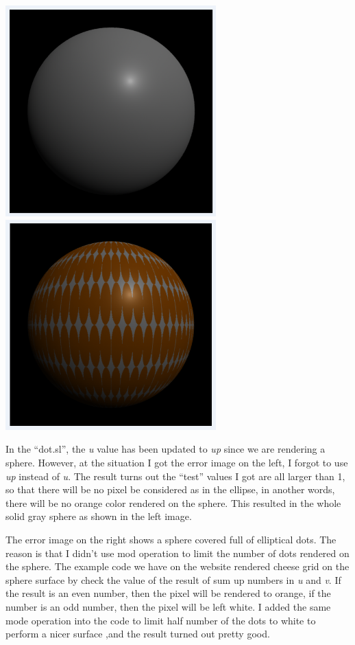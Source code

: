 \documentclass[letterpaper,14pt,titlepage,fleqn]{article}
\begin{document}
\includegraphics[width=3.2in]{3}
\includegraphics[width=3.2in]{2}

In the ``dot.sl'', the \textit{u} value has been updated to \textit{up} since we are rendering a sphere. However, at the situation I got the error image on the left, I forgot to use \textit{up} instead of \textit{u}. The result turns out the ``test'' values I got are all larger than 1, so that there will be no pixel be considered as in the ellipse, in another words, there will be no orange color rendered on the sphere. This resulted in the whole solid gray sphere as shown in the left image.

The error image on the right shows a sphere covered full of elliptical dots. The reason is that I didn't use mod operation to limit the number of dots rendered on the sphere. The example code we have on the website rendered cheese grid on the sphere surface by check the value of the result of sum up numbers in \textit{u} and \textit{v}. If the result is an even number, then the pixel will be rendered to orange, if the number is an odd number, then the pixel will be left white. I added the same mode operation into the code to limit half number of the dots to white to perform a nicer surface ,and the result turned out pretty good.
\end{document}
